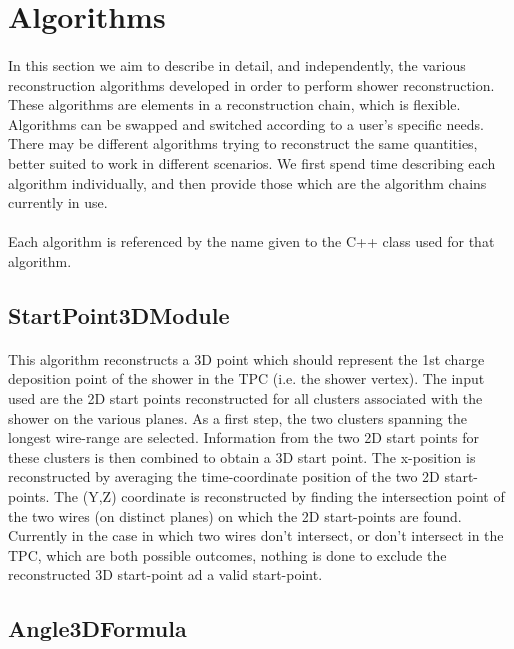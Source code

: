 \section{Algorithms}
\label{sec:algos}
\paragraph{}In this section we aim to describe in detail, and independently, the various reconstruction algorithms developed in order to perform shower reconstruction. These algorithms are elements in a reconstruction chain, which is flexible. Algorithms can be swapped and switched according to a user's specific needs. There may be different algorithms trying to reconstruct the same quantities, better suited to work in different scenarios. We first spend time describing each algorithm individually, and then provide those which are the algorithm chains currently in use.
\paragraph{}Each algorithm is referenced by the name given to the C++ class used for that algorithm.

\subsection{StartPoint3DModule}
\paragraph{}This algorithm reconstructs a 3D point which should represent the 1st charge deposition point of the shower in the TPC (i.e. the shower vertex). The input used are the 2D start points reconstructed for all clusters associated with the shower on the various planes. As a first step, the two clusters spanning the longest wire-range are selected. Information from the two 2D start points for these clusters is then combined to obtain a 3D start point. The x-position is reconstructed by averaging the time-coordinate position of the two 2D start-points. The (Y,Z) coordinate is reconstructed by finding the intersection point of the two wires (on distinct planes) on which the 2D start-points are found. {\color{red} Currently in the case in which two wires don't intersect, or don't intersect in the TPC, which are both possible outcomes, nothing is done to exclude the reconstructed 3D start-point ad a valid start-point.}

\subsection{Angle3DFormula}
